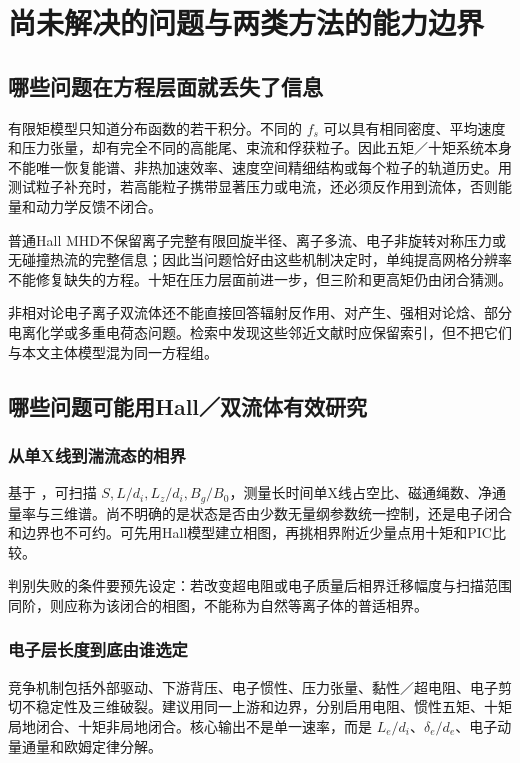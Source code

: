 \chapter{尚未解决的问题与两类方法的能力边界}\label{ch:open}
\section{哪些问题在方程层面就丢失了信息}
有限矩模型只知道分布函数的若干积分。不同的 $f_s$ 可以具有相同密度、平均速度和压力张量，却有完全不同的高能尾、束流和俘获粒子。因此五矩／十矩系统本身不能唯一恢复能谱、非热加速效率、速度空间精细结构或每个粒子的轨道历史。用测试粒子补充时，若高能粒子携带显著压力或电流，还必须反作用到流体，否则能量和动力学反馈不闭合。

普通Hall MHD不保留离子完整有限回旋半径、离子多流、电子非旋转对称压力或无碰撞热流的完整信息；因此当问题恰好由这些机制决定时，单纯提高网格分辨率不能修复缺失的方程。十矩在压力层面前进一步，但三阶和更高矩仍由闭合猜测。

非相对论电子离子双流体还不能直接回答辐射反作用、对产生、强相对论焓、部分电离化学或多重电荷态问题。检索中发现这些邻近文献时应保留索引，但不把它们与本文主体模型混为同一方程组。

\section{哪些问题可能用Hall／双流体有效研究}
\subsection{从单X线到湍流态的相界}
基于 \citet{Huang2011,Huang2024}，可扫描 $S,L/d_i,L_z/d_i,B_g/B_0$，测量长时间单X线占空比、磁通绳数、净通量率与三维谱。尚不明确的是状态是否由少数无量纲参数统一控制，还是电子闭合和边界也不可约。可先用Hall模型建立相图，再挑相界附近少量点用十矩和PIC比较。

判别失败的条件要预先设定：若改变超电阻或电子质量后相界迁移幅度与扫描范围同阶，则应称为该闭合的相图，不能称为自然等离子体的普适相界。

\subsection{电子层长度到底由谁选定}
竞争机制包括外部驱动、下游背压、电子惯性、压力张量、黏性／超电阻、电子剪切不稳定性及三维破裂。建议用同一上游和边界，分别启用电阻、惯性五矩、十矩局地闭合、十矩非局地闭合。核心输出不是单一速率，而是 $L_e/d_i$、$\delta_e/d_e$、电子动量通量和欧姆定律分解。\citep{Sullivan2009,Ng2015,Ng2017}

